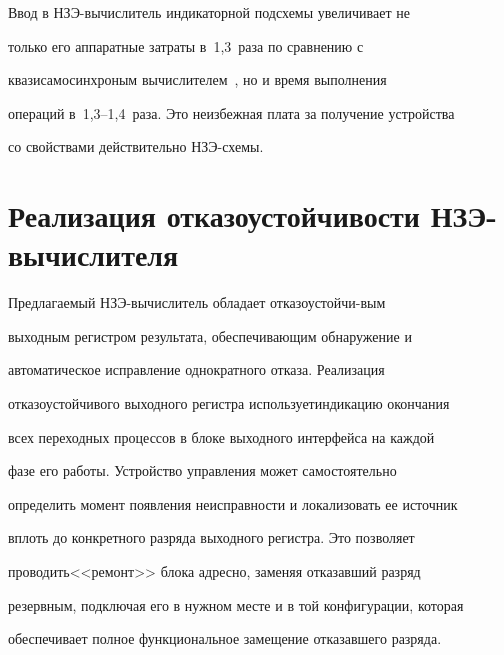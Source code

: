    Ввод в НЗЭ-вычислитель индикаторной подсхемы увеличивает не


только его аппаратные затраты в~1,3~раза по сравнению с


квазисамосинхроным вычислителем~\cite{9-1}, но и время выполнения


операций в~1,3--1,4~раза. Это неизбежная плата за получение устройства


со свойствами действительно НЗЭ-схемы.










   \section{Реализация отказоустойчивости НЗЭ-вычислителя}


   







   Предлагаемый НЗЭ-вычислитель обладает отказоустой\-чи-\linebreak вым


выходным регистром результата, обеспечивающим обнаружение и


автоматическое исправление однократного отказа. Реализация


отказоустойчивого выходного регистра использует\linebreak индикацию окончания


всех переходных процессов в блоке выходного интерфейса на каждой


фазе его работы. Устройство управления может самостоятельно


определить момент появления неисправности и локализовать ее источник


вплоть до конкретного разряда выходного регистра. Это позволяет


проводить\linebreak  <<ремонт>> блока адресно, заменяя отказавший разряд


резервным, подключая его в нужном месте и в той конфигурации, которая


обеспечивает полное функциональное замещение отказавшего разряда.





